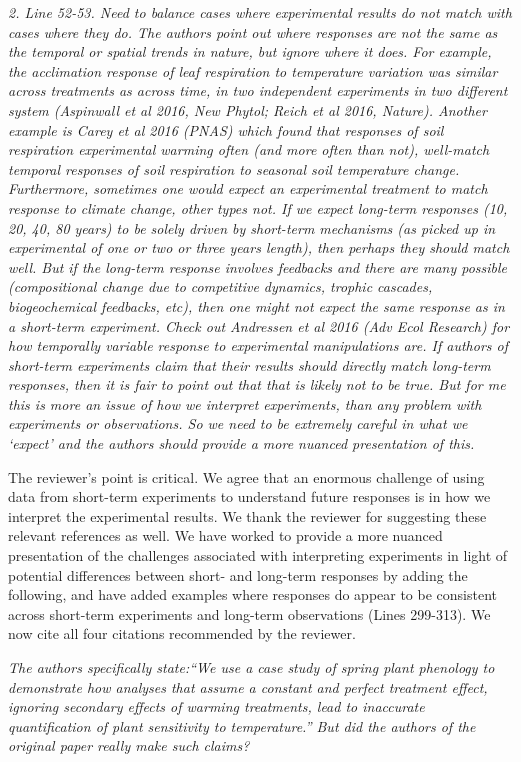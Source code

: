 \documentclass[11pt,a4paper]{letter}
\begin{document}
\begin{letter}{}
\par \emph{2. Line 52-53. Need to balance cases where experimental results do not match with cases where they do. The authors point out where responses are not the same as the temporal or spatial trends in nature, but ignore where it does. For example, the acclimation response of leaf respiration to temperature variation was similar across treatments as across time, in two independent experiments in two different system (Aspinwall et al 2016, New Phytol; Reich et al 2016, Nature). Another example is Carey et al 2016 (PNAS) which found that responses of soil respiration experimental warming often (and more often than not), well-match temporal responses of soil respiration to seasonal soil temperature change. Furthermore, sometimes one would expect an experimental treatment to match response to climate change, other types not. If we expect long-term responses (10, 20, 40, 80 years) to be solely driven by short-term mechanisms (as picked up in experimental of one or two or three years length), then perhaps they should match well. But if the long-term response involves feedbacks and there are many possible (compositional change due to competitive dynamics, trophic cascades, biogeochemical feedbacks, etc), then one might not expect the same response as in a short-term experiment. Check out Andressen et al 2016 (Adv Ecol Research) for how temporally variable response to experimental manipulations are. If authors of short-term
experiments claim that their results should directly match long-term responses, then it is fair to point out that that is likely not to be true. But for me this is more an issue of how we interpret experiments, than any problem with experiments or observations. So we need to be extremely careful in what we `expect' and the authors should provide a more nuanced presentation of this.}

\par The reviewer's point is critical. We agree that an enormous challenge of using data from short-term experiments to understand future responses is in how we interpret the experimental results. We thank the reviewer for suggesting these relevant references as well. We have worked to provide a more nuanced presentation of the challenges associated with interpreting experiments in light of potential differences between short- and long-term responses by adding the following, and have added examples where responses do appear to be consistent across short-term experiments and long-term observations (Lines 299-313). We now cite all four citations recommended by the reviewer. 
\\
\par \emph{The authors specifically state:``We use a case study of spring plant phenology to demonstrate how analyses that assume a constant and perfect treatment effect, ignoring secondary effects of warming treatments, lead to inaccurate quantification of plant sensitivity to temperature.'' But did the authors of the original paper really make such claims?}


\end{letter}
\end{document}
